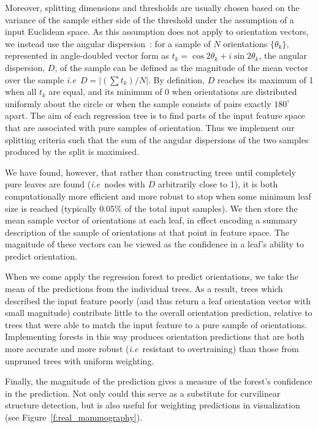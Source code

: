 \documentclass{bmvc2k}
\def\ie{\emph{i.e}\bmvaOneDot}
\newcommand{\fref}[1]{Figure~\ref{#1}}
\def\dtcwt{DT-$\mathbb{C}$WT}
\newcommand{\comment}[1]{}
\begin{document}
Moreover, splitting dimensions and thresholds are usually chosen based on the variance of the sample either side of the threshold under the assumption of a input Euclidean space. As this assumption does not apply to orientation vectors, we instead use the angular dispersion~\cite{Mardia_Jupp_00}: for a sample of $N$ orientations $\{\theta_k\}$, represented in angle-doubled vector form as $t_k = \cos 2\theta_k + i\sin 2\theta_k$, the angular dispersion, $D$, of the sample can be defined as the magnitude of the mean vector over the sample \ie~$D = |(\sum{t_k})/N|$. 
%
%
By definition, $D$ reaches its maximum of 1 when all $t_k$ are equal, and its minimum of 0 when orientations are distributed uniformly about the circle or when the sample consists of pairs exactly $180^\circ$ apart. The aim of each regression tree is to find parts of the input feature space that are associated with pure samples of orientation. Thus we implement our splitting criteria such that the sum of the angular dispersions of the two samples produced by the split is maximised.

We have found, however, that rather than constructing trees until completely pure leaves are found (\ie~nodes with $D$ arbitrarily close to 1), it is both computationally more efficient and more robust to stop when some minimum leaf size is reached (typically 0.05\% of the total input samples). We then store the mean sample vector of orientations at each leaf, in effect encoding a summary description of the sample of orientations at that point in feature space. The magnitude of these vectors can be viewed as the confidence in a leaf's ability to predict orientation. 

When we come apply the regression forest to predict orientations, we take the mean of the predictions from the individual trees. As a result, trees which described the input feature poorly (and thus return a leaf orientation vector with small magnitude) contribute little to the overall orientation prediction, relative to trees that were able to match the input feature to a pure sample of orientations. Implementing forests in this way produces orientation predictions that are both more accurate and more robust (\ie~resistant to overtraining) than those from unpruned trees with uniform weighting. 

Finally, the magnitude of the prediction gives a measure of the forest's confidence in the prediction. Not only could this serve as a substitute for curvilinear structure detection, but is also useful for weighting predictions in visualization (see \fref{f:real_mammography}). 
\end{document}
